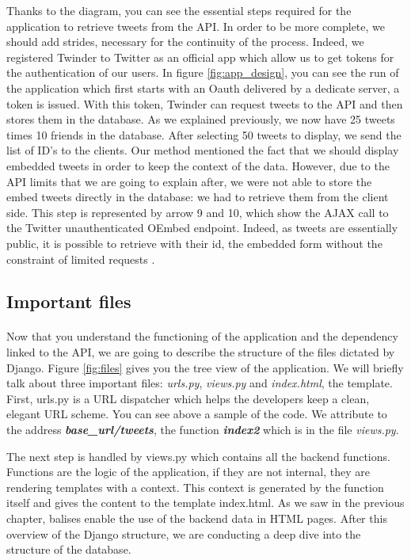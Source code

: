 Thanks to the diagram, you can see the essential steps required for the application to retrieve tweets from the API. In order to be more complete, we should add strides, necessary for the continuity of the process. Indeed, we registered Twinder to Twitter as an official app which allow us to get tokens for the authentication of our users. In figure \ref{fig:app_design}, you can see the run of the application which first starts with an Oauth delivered by a dedicate server, a token is issued. With this token, Twinder can request tweets to the API and then stores them in the database. As we explained previously, we now have 25 tweets times 10 friends in the database. After selecting 50 tweets to display, we send the list of ID's to the clients. Our method mentioned the fact that we should display embedded tweets in order to keep the context of the data. However, due to the API limits that we are going to explain after, we were not able to store the embed tweets directly in the database: we had to retrieve them from the client side. This step is represented by arrow 9 and 10, which show the AJAX call to the Twitter unauthenticated OEmbed endpoint. Indeed, as tweets are essentially public, it is possible to retrieve with their id, the embedded form without the constraint  of limited requests \cite{t_oembed1}.\\

\subsection{Important files}

\paragraph{}
Now that you understand the functioning of the application and the dependency linked to the API, we are going to describe the structure of the files dictated by Django. Figure \ref{fig:files} gives you the tree view of the application. We will briefly talk about three important files:  \textit{urls.py},  \textit{views.py} and  \textit{index.html}, the template. First, urls.py is a URL dispatcher which helps the developers keep a clean, elegant URL scheme. You can see above a sample of the code. We attribute to the address \textbf{\textit{base\_url/tweets}}, the function \textbf{\textit{index2}} which is in the file \textit{views.py}. 

 

The next step is handled by views.py which contains all the backend functions. Functions are the logic of the application, if they are not internal, they are rendering templates with a context. This context is generated by the function itself and gives the content to the template index.html. As we saw in the previous chapter, balises enable the use of the backend data in HTML pages. After this overview of the Django structure, we are conducting a deep dive into the structure of the database. \\\\

